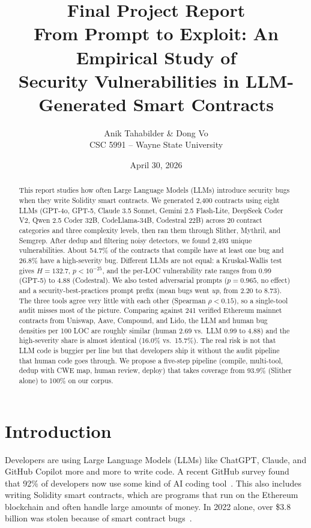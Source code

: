 \documentclass[11pt]{article}
\title{\textbf{Final Project Report}\\[0.3cm]
\Large From Prompt to Exploit: An Empirical Study of\\Security Vulnerabilities in LLM-Generated Smart Contracts}
\author{Anik Tahabilder \& Dong Vo\\\small CSC 5991 -- Wayne State University}
\date{April 30, 2026}
\begin{document}
\maketitle

\begin{abstract}
\noindent This report studies how often Large Language Models (LLMs) introduce security bugs when they write Solidity smart contracts. We generated 2,400 contracts using eight LLMs (GPT-4o, GPT-5, Claude 3.5 Sonnet, Gemini 2.5 Flash-Lite, DeepSeek Coder V2, Qwen 2.5 Coder 32B, CodeLlama-34B, Codestral 22B) across 20 contract categories and three complexity levels, then ran them through Slither, Mythril, and Semgrep. After dedup and filtering noisy detectors, we found 2,493 unique vulnerabilities. About 54.7\% of the contracts that compile have at least one bug and 26.8\% have a high-severity bug. Different LLMs are not equal: a Kruskal-Wallis test gives $H{=}132.7$, $p{<}10^{-25}$, and the per-LOC vulnerability rate ranges from 0.99 (GPT-5) to 4.88 (Codestral). We also tested adversarial prompts ($p{=}0.965$, no effect) and a security-best-practices prompt prefix (mean bugs went \emph{up}, from 2.20 to 8.73). The three tools agree very little with each other (Spearman $\rho < 0.15$), so a single-tool audit misses most of the picture. Comparing against 241 verified Ethereum mainnet contracts from Uniswap, Aave, Compound, and Lido, the LLM and human bug densities per 100 LOC are roughly similar (human 2.69 vs.\ LLM 0.99 to 4.88) and the high-severity share is almost identical (16.0\% vs.\ 15.7\%). The real risk is not that LLM code is buggier per line but that developers ship it without the audit pipeline that human code goes through. We propose a five-step pipeline (compile, multi-tool, dedup with CWE map, human review, deploy) that takes coverage from 93.9\% (Slither alone) to 100\% on our corpus.
\end{abstract}

\section{Introduction}

Developers are using Large Language Models (LLMs) like ChatGPT, Claude, and GitHub Copilot more and more to write code. A recent GitHub survey found that 92\% of developers now use some kind of AI coding tool~\cite{github_copilot}. This also includes writing Solidity smart contracts, which are programs that run on the Ethereum blockchain and often handle large amounts of money. In 2022 alone, over \$3.8 billion was stolen because of smart contract bugs~\cite{chainalysis2023}.
\end{document}
